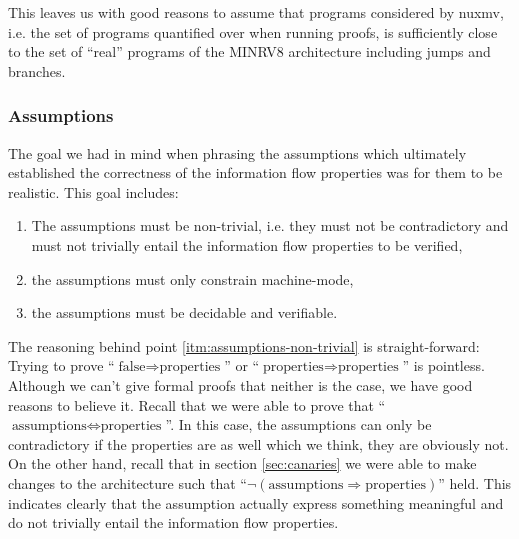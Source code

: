 This leaves us with good reasons to assume that programs considered by \gls{nuxmv}, i.e. the set of programs quantified over when running proofs, is sufficiently close to the set of \enquote{real} programs of the MINRV8 architecture including jumps and branches.

\subsubsection{Assumptions}


The goal we had in mind when phrasing the assumptions which ultimately established the correctness of the information flow properties was for them to be realistic.
This goal includes:
\begin{enumerate}
    \item \label{itm:assumptions-non-trivial}
    The assumptions must be non-trivial, i.e. they must not be contradictory and must not trivially entail the information flow properties to be verified,
    \item \label{itm:assumptions-machine-mode}
    the assumptions must only constrain machine-mode,
    \item \label{itm:assumptions-verifiable}
    the assumptions must be decidable and verifiable.
\end{enumerate}

The reasoning behind point \ref{itm:assumptions-non-trivial} is straight-forward:
Trying to prove \enquote{$ \text{false} \Rightarrow \text{properties} $} or \enquote{$ \text{properties} \Rightarrow \text{properties} $} is pointless.
Although we can't give formal proofs that neither is the case, we have good reasons to believe it.
Recall that we were able to prove that \enquote{$ \text{assumptions} \Leftrightarrow \text{properties} $}.
In this case, the assumptions can only be contradictory if the properties are as well which we think, they are obviously not.
On the other hand, recall that in section \ref{sec:canaries} we were able to make changes to the architecture such that \enquote{$ \neg(\text{assumptions} \Rightarrow \text{properties}) $} held.
This indicates clearly that the assumption actually express something meaningful and do not trivially entail the information flow properties.

